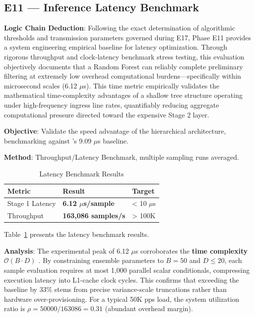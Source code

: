 \documentclass[sigconf]{acmart}
\begin{document}
\subsection{E11 --- Inference Latency Benchmark}
\textbf{Logic Chain Deduction}: Following the exact determination of algorithmic thresholds and transmission parameters governed during E17, Phase E11 provides a system engineering empirical baseline for latency optimization. Through rigorous throughput and clock-latency benchmark stress testing, this evaluation objectively documents that a Random Forest can reliably complete preliminary filtering at extremely low overhead computational burdens---specifically within microsecond scales (6.12 $\mu$s). This time metric empirically validates the mathematical time-complexity advantages of a shallow tree structure operating under high-frequency ingress line rates, quantifiably reducing aggregate computational pressure directed toward the expensive Stage 2 layer.

\textbf{Objective}: Validate the speed advantage of the hierarchical architecture, benchmarking against \cite{6}'s 9.09 $\mu$s baseline.

\textbf{Method}: Throughput/Latency Benchmark, multiple sampling runs averaged.

\begin{table}[!h]
\caption{Latency Benchmark Results}
\label{tab:latency}
\begin{tabular}{lll}
\toprule
\textbf{Metric} & \textbf{Result} & \textbf{Target} \\
\midrule
Stage 1 Latency & \textbf{6.12 $\mu$s/sample} & < 10 $\mu$s \\
Throughput & \textbf{163,086 samples/s} & > 100K \\
\bottomrule
\end{tabular}
\end{table}

\noindent Table~\ref{tab:latency} presents the latency benchmark results.

\textbf{Analysis}: The experimental peak of 6.12 $\mu$s corroborates the \textbf{time complexity $\mathcal{O}(B \cdot D)$ \cite{11}}. By constraining ensemble parameters to $B=50$ and $D \le 20$, each sample evaluation requires at most 1,000 parallel scalar conditionals, compressing execution latency into L1-cache clock cycles. This confirms that exceeding the \cite{6} baseline by 33\% stems from precise variance-scale truncations rather than hardware over-provisioning. For a typical 50K pps load, the system utilization ratio is $\rho = 50000/163086 = 0.31$ (abundant overhead margin).
\end{document}
